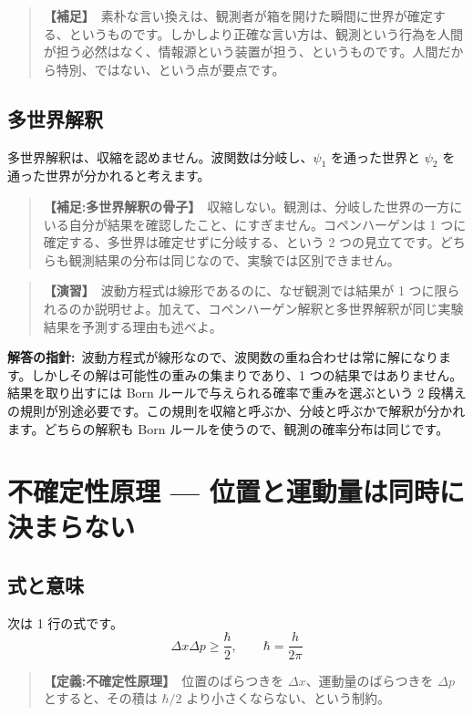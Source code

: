 \documentclass{article}
\begin{document}
\begin{quote}
\textbf{【補足】}\ 素朴な言い換えは、観測者が箱を開けた瞬間に世界が確定する、というものです。しかしより正確な言い方は、観測という行為を人間が担う必然はなく、情報源という装置が担う、というものです。人間だから特別、ではない、という点が要点です。
\end{quote}

\subsection{多世界解釈}

多世界解釈は、収縮を認めません。波関数は分岐し、\(\psi_1\) を通った世界と \(\psi_2\) を通った世界が分かれると考えます。

\begin{quote}
\textbf{【補足:多世界解釈の骨子】}\ 収縮しない。観測は、分岐した世界の一方にいる自分が結果を確認したこと、にすぎません。コペンハーゲンは 1 つに確定する、多世界は確定せずに分岐する、という 2 つの見立てです。どちらも観測結果の分布は同じなので、実験では区別できません。
\end{quote}

\begin{quote}
\textbf{【演習】}\ 波動方程式は線形であるのに、なぜ観測では結果が 1 つに限られるのか説明せよ。加えて、コペンハーゲン解釈と多世界解釈が同じ実験結果を予測する理由も述べよ。
\end{quote}

\textbf{解答の指針:}\ 波動方程式が線形なので、波関数の重ね合わせは常に解になります。しかしその解は可能性の重みの集まりであり、1 つの結果ではありません。結果を取り出すには Born ルールで与えられる確率で重みを選ぶという 2 段構えの規則が別途必要です。この規則を収縮と呼ぶか、分岐と呼ぶかで解釈が分かれます。どちらの解釈も Born ルールを使うので、観測の確率分布は同じです。

\section{不確定性原理 — 位置と運動量は同時に決まらない}

\subsection{式と意味}

次は 1 行の式です。
\[ \Delta x \Delta p \ge \frac{\hbar}{2}, \qquad \hbar = \frac{h}{2\pi} \]

\begin{quote}
\textbf{【定義:不確定性原理】}\ 位置のばらつきを \(\Delta x\)、運動量のばらつきを \(\Delta p\) とすると、その積は \(\hbar / 2\) より小さくならない、という制約。
\end{quote}
\end{document}

